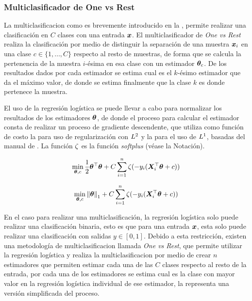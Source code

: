 \subsubsection{Multiclasificador de One vs Rest}
La multiclasificacion como es brevemente introducido en la , permite realizar una clasificación en $C$ clases con una entrada ${\bm{x}}$. El multiclasificador de \emph{One vs Rest} realiza la clasificación por medio de distinguir la separación de una muestra ${\bm{x}}_i$ en una clase $c \in \{1, \ldots, C\}$ respecto al resto de muestras, de forma que se calcula la pertenencia de la muestra $i$-\'esima en esa clase con un estimador ${\bm{\theta}}_c$. De los resultados dados por cada estimador se estima cual es el $k$-\'esimo estimador que da el máximo valor, de donde se estima finalmente que la clase $k$ es donde pertenece la muestra.

El uso de la regresión logística se puede llevar a cabo para normalizar los resultados de los estimadores ${\bm{\theta}}$, de donde el proceso para calcular el estimador consta de realizar un proceso de gradiente descendente, que utiliza como función de costo la  para uso de regularización con $L^2$ y la  para el uso de $L^1$, basadas del manual de \cite{sklearn_api}. La función $\zeta$ es la función \emph{softplus} (véase la Notación).

\begin{equation} \label{eq:ovr-reg-l2costfunc}
  \min_{{\bm{\theta}}, c} \frac{1}{2}{\bm{\theta}}^{\top} {\bm{\theta}} + C \sum_{i=1}^n \zeta(- y_i ({\bm{X}}_i^{\top} {\bm{\theta}} + c))
\end{equation}

\begin{equation} \label{eq:ovr-reg-l1costfunc}
  \min_{{\bm{\theta}}, c} \left\lVert{\bm{\theta}}\right\rVert_1 + C \sum_{i=1}^n \zeta(- y_i ({\bm{X}}_i^{\top} {\bm{\theta}} + c))
\end{equation}

En el caso para realizar una multiclasificaci\'on, la regresión logística solo puede realizar una clasificación binaria, esto es que para una entrada ${\bm{x}}$, esta solo puede realizar una clasificación con salidas $y \in [0, 1]$. Debido a esta restricción, existen una metodología de multiclasificacion llamada \emph{One vs Rest}, que permite utilizar la regresión logística y realiza la multiclasificacion por medio de crear $n$ estimadores que permiten estimar cada una de las $C$ clases respecto al resto de la entrada, por cada una de los estimadores se estima cual es la clase con mayor valor en la regresión logística individual de ese estimador, la  representa una versión simplificada del proceso.

